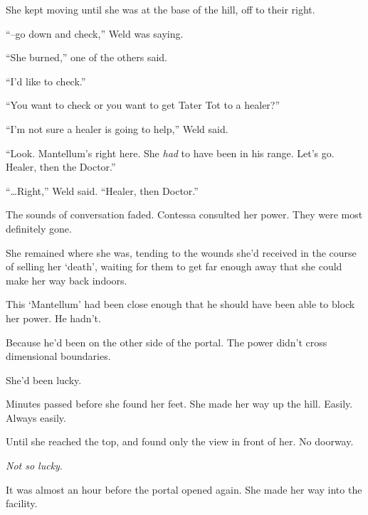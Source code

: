 She kept moving until she was at the base of the hill, off to their right.



``--go down and check,'' Weld was saying.



``She burned,'' one of the others said.



``I'd like to check.''



``You want to check or you want to get Tater Tot to a healer?''



``I'm not sure a healer is going to help,'' Weld said.



``Look.  Mantellum's right here.  She \emph{had} to have been in his range.  Let's go.  Healer, then the Doctor.''



``\ldots{}Right,'' Weld said.  ``Healer, then Doctor.''



The sounds of conversation faded.  Contessa consulted her power.  They were most definitely gone.



She remained where she was, tending to the wounds she'd received in the course of selling her `death', waiting for them to get far enough away that she could make her way back indoors.



This `Mantellum' had been close enough that he should have been able to block her power.  He hadn't.



Because he'd been on the other side of the portal.  The power didn't cross dimensional boundaries.



She'd been lucky.



Minutes passed before she found her feet.  She made her way up the hill.  Easily.  Always easily.



Until she reached the top, and found only the view in front of her.  No doorway.



\emph{Not so lucky}.



\sectionbreak



It was almost an hour before the portal opened again.  She made her way into the facility.



